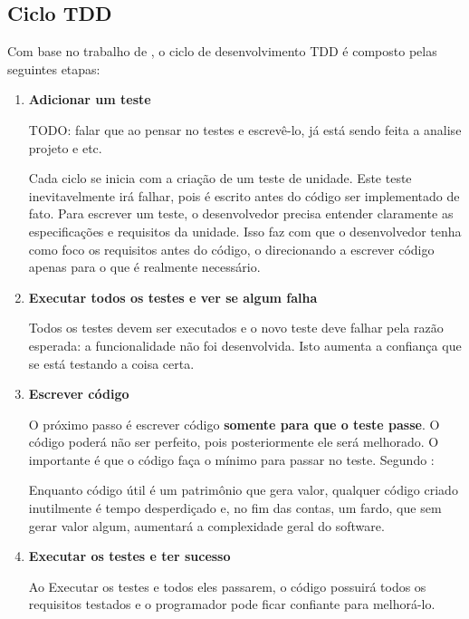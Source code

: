 \subsection{Ciclo TDD}
\label{ssub:ciclo_tdd}

Com base no trabalho de , o ciclo de desenvolvimento TDD é composto pelas seguintes etapas:

\begin{enumerate}
\item \textbf{Adicionar um teste}

TODO: falar que ao pensar no testes e escrevê-lo, já está sendo feita a analise projeto e etc.

Cada ciclo se inicia com a criação de um teste de unidade. Este teste inevitavelmente irá falhar, pois é escrito antes do código ser implementado de fato. Para escrever um teste, o desenvolvedor precisa entender claramente as especificações e requisitos da unidade. Isso faz com que o desenvolvedor tenha como foco os requisitos antes do código, o direcionando a escrever código apenas para o que é realmente necessário.

\item \textbf{Executar todos os testes e ver se algum falha}

Todos os testes devem ser executados e o novo teste deve falhar pela razão esperada: a funcionalidade não foi desenvolvida. Isto aumenta a confiança que se está testando a coisa certa.

\item \textbf{Escrever código}

O próximo passo é escrever código \textbf{somente para que o teste passe}. O código poderá não ser perfeito, pois posteriormente ele será melhorado. O importante é que o código faça o mínimo para passar no teste. Segundo :

\begin{citacao}
Enquanto código útil é um patrimônio que gera valor, qualquer código criado inutilmente é tempo desperdiçado e, no fim das contas, um fardo, que sem gerar valor algum, aumentará a complexidade geral do software.
\end{citacao}

\item \textbf{Executar os testes e ter sucesso}

Ao Executar os testes e todos eles passarem, o código possuirá todos os requisitos testados e o programador pode ficar confiante para melhorá-lo.


\end{enumerate}

